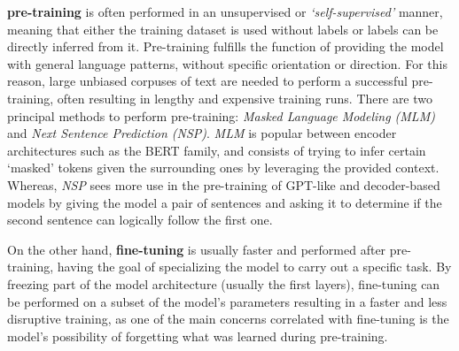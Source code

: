 \textbf{pre-training} is often performed in an unsupervised or \emph{`self-supervised'} manner, meaning that either the training dataset is used without labels or labels can be directly inferred from it.
Pre-training fulfills the function of providing the model with general language patterns, without specific orientation or direction.
For this reason, large unbiased corpuses of text are needed to perform a successful pre-training, often resulting in lengthy and expensive training runs.
There are two principal methods to perform pre-training: \emph{Masked Language Modeling (MLM)} and \emph{Next Sentence Prediction (NSP)}.
\emph{MLM} is popular between encoder architectures such as the BERT family, and consists of trying to infer certain `masked' tokens given the surrounding ones by leveraging the provided context.
Whereas, \emph{NSP} sees more use in the pre-training of GPT-like and decoder-based models by giving the model a pair of sentences and asking it to determine if the second sentence can logically follow the first one.

On the other hand, \textbf{fine-tuning} is usually faster and performed after pre-training, having the goal of specializing the model to carry out a specific task.
By freezing part of the model architecture (usually the first layers), fine-tuning can be performed on a subset of the model's parameters resulting in a faster and less disruptive training, as one of the main concerns correlated with fine-tuning is the model's possibility of forgetting what was learned during pre-training.